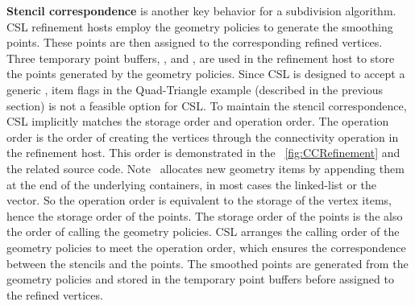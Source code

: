 \noindent \textbf{Stencil correspondence} is another key
behavior for a subdivision algorithm.
CSL refinement hosts employ the geometry policies
to generate the smoothing points. These points are then assigned 
to the corresponding refined vertices. Three temporary
point buffers, , 
 and , 
are used in the refinement host to store the points generated
by the geometry policies. Since CSL is designed
to accept a generic \cgalpoly , item flags in the 
Quad-Triangle example (described in the previous section) 
is not a feasible option for CSL. To maintain the stencil 
correspondence, CSL implicitly matches the storage 
order and operation order. The operation order is the
order of creating the vertices through the connectivity
operation in the refinement host. This order is demonstrated
in the \figurename\ \ref{fig:CCRefinement} and the related 
source code. Note \cgalpoly\ allocates new
geometry items by appending them at the end of the underlying
containers, in most cases the linked-list or the vector.
So the operation order is equivalent to the storage of the 
vertex items, hence the storage order of the points.
The storage order of the points is the also the order of calling 
the geometry policies.
CSL arranges the calling order of the geometry policies
to meet the operation order, which ensures the 
correspondence between the stencils and the points.
The smoothed points are generated 
from the geometry policies and stored in the temporary 
point buffers before assigned to the refined vertices.

